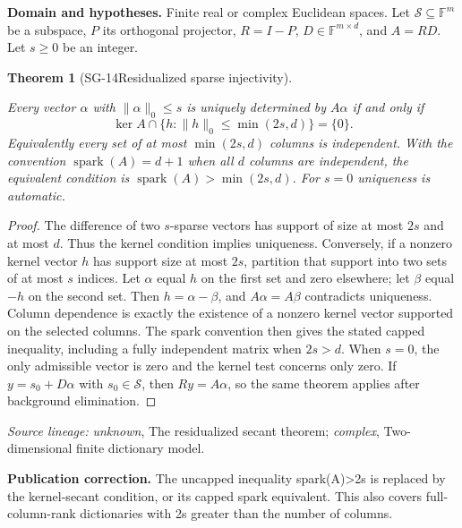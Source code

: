 \documentclass[11pt]{article}
\newtheorem{theorem}{Theorem}[section]
\theoremstyle{definition}\newtheorem{definition}[theorem]{Definition}
\theoremstyle{remark}\newtheorem{remark}[theorem]{Remark}
\begin{document}
\par{\small\textbf{Domain and hypotheses.} Finite real or complex Euclidean spaces. Let $\mathcal S\subseteq\mathbb F^m$ be a subspace, $P$ its orthogonal projector, $R=I-P$, $D\in\mathbb F^{m\times d}$, and $A=RD$. Let $s\ge0$ be an integer.}\par
\begin{theorem}[SG-14\quad Residualized sparse injectivity]\label{SG-14}

Every vector $\alpha$ with $\|\alpha\|_0\le s$ is uniquely determined by
$A\alpha$ if and only if
\[
 \ker A\cap\{h:\|h\|_0\le\min(2s,d)\}=\{0\}.
\]
Equivalently every set of at most $\min(2s,d)$ columns is independent.
With the convention $\operatorname{spark}(A)=d+1$ when all $d$ columns are
independent, the equivalent condition is
$\operatorname{spark}(A)>\min(2s,d)$.
For $s=0$ uniqueness is automatic.

\end{theorem}
\begin{proof}

The difference of two $s$-sparse vectors has support of size at most $2s$
and at most $d$. Thus the kernel condition implies uniqueness.
Conversely, if a nonzero kernel vector $h$ has support size at most $2s$,
partition that support into two sets of at most $s$ indices. Let $\alpha$
equal $h$ on the first set and zero elsewhere; let $\beta$ equal $-h$ on
the second set. Then $h=\alpha-\beta$, and $A\alpha=A\beta$ contradicts
uniqueness. Column dependence is exactly the existence of a nonzero kernel
vector supported on the selected columns. The spark convention then gives
the stated capped inequality, including a fully independent matrix when
$2s>d$. When $s=0$, the only admissible vector is zero and the kernel test
concerns only zero. If $y=s_0+D\alpha$ with $s_0\in\mathcal S$, then
$Ry=A\alpha$, so the same theorem applies after background elimination.

\end{proof}

\par{\small\color{Teal}\textit{Source lineage:} \textit{unknown}, The residualized secant theorem; \textit{complex}, Two-dimensional finite dictionary model.}\par

\par{\small\textbf{Publication correction.} The uncapped inequality spark(A)>2s is replaced by the kernel-secant condition, or its capped spark equivalent. This also covers full-column-rank dictionaries with 2s greater than the number of columns.}\par
\end{document}
